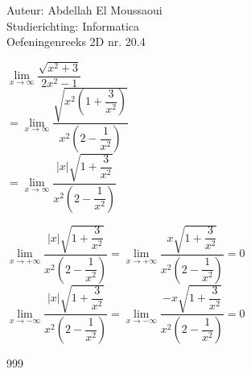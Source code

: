 \documentclass[a4paper]{article}
\begin{document}
  
\noindent \large Auteur: Abdellah El Moussaoui \\
\noindent \large Studierichting: Informatica\\
\noindent \large Oefeningenreeks 2D nr. 20.4\\

\medskip

\normalsize

$\lim\limits_{x \rightarrow \infty} \dfrac{\sqrt{x^2 + 3}}{2x^2 - 1}$\\

$=\lim\limits_{x \rightarrow \infty} \dfrac{\sqrt{x^2\left (1 + \dfrac{3}{x^2}\right )}}{x^2 \left (2 - \dfrac{1}{x^2} \right )}$\\

$=\lim\limits_{x \rightarrow \infty} \dfrac{\left |x \right |\sqrt{1 + \dfrac{3}{x^2}}}{x^2 \left (2 - \dfrac{1}{x^2} \right )}$\\

\medskip

$\lim\limits_{x \rightarrow +\infty} \dfrac{\left |x \right |\sqrt{1 + \dfrac{3}{x^2}}}{x^2 \left (2 - \dfrac{1}{x^2} \right )} = \lim\limits_{x \rightarrow +\infty} \dfrac{x\sqrt{1 + \dfrac{3}{x^2}}}{x^2 \left (2 - \dfrac{1}{x^2} \right )} = 0$\\

$\lim\limits_{x \rightarrow -\infty} \dfrac{\left |x \right |\sqrt{1 + \dfrac{3}{x^2}}}{x^2 \left (2 - \dfrac{1}{x^2} \right )} = \lim\limits_{x \rightarrow -\infty} \dfrac{-x\sqrt{1 + \dfrac{3}{x^2}}}{x^2 \left (2 - \dfrac{1}{x^2} \right )} = 0$\\

\begin{thebibliography}{999}
\end{thebibliography}
\end{document}
